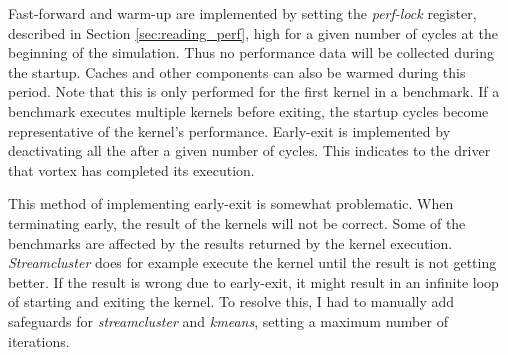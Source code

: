 Fast-forward and warm-up are implemented by setting the \textit{perf-lock} register, described in Section \ref{sec:reading_perf}, high for a given number of cycles at the beginning of the simulation. Thus no performance data will be collected during the startup. Caches and other components can also be warmed during this period. Note that this is only performed for the first kernel in a benchmark. If a benchmark executes multiple kernels before exiting, the startup cycles become representative of the kernel's performance. Early-exit is implemented by deactivating all the  after a given number of cycles. This indicates to the driver that \Gls{vortex} has completed its execution. 

This method of implementing early-exit is somewhat problematic. When terminating early, the result of the kernels will not be correct. Some of the benchmarks are affected by the results returned by the kernel execution. \textit{Streamcluster} does for example execute the kernel until the result is not getting better. If the result is wrong due to early-exit, it might result in an infinite loop of starting and exiting the kernel. To resolve this, I had to manually add safeguards for \textit{streamcluster} and \textit{kmeans}, setting a maximum number of iterations.
